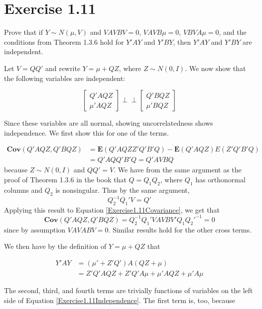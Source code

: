 \documentclass{article}
\newcommand{\indep}{\perp \!\!\! \perp}
\newcommand{\E}{\boldsymbol{E}}
\newcommand{\cov}{\boldsymbol{Cov}}
\begin{document}
\section*{Exercise 1.11}

Prove that if $Y \sim N(\mu, V)$ and $VAVBV=0$, $VAVB\mu=0$, $VBVA\mu=0$, and the conditions from Theorem 1.3.6 hold for $Y'AY$ and $Y'BY$, then $Y'AY$ and $Y'BY$ are independent.

Let $V=QQ'$ and rewrite $Y=\mu + QZ$, where $Z\sim N(0,I)$. We now show that the following variables are independent:

\begin{equation}
\label{Exercise1.11Independence}
\begin{bmatrix}
Q'AQZ \\
\mu'AQZ
\end{bmatrix}
\indep
\begin{bmatrix}
Q'BQZ \\
\mu'BQZ
\end{bmatrix}
\end{equation}

Since these variables are all normal, showing uncorrelatedness shows independence. We first show this for one of the terms.

\begin{align}
\label{Exercise1.11Covariance}
\cov(Q'AQZ, Q'BQZ) &= \E(Q'AQZZ'Q'B'Q) - \E(Q'AQZ)E(Z'Q'B'Q) \\
&= Q'AQQ'B'Q = Q'AVBQ
\end{align}
because $Z \sim N(0, I)$ and $QQ' = V$. We have from the same argument as the proof of Theorem 1.3.6 in the book that $Q = Q_1Q_2$, where $Q_1$ has orthonormal columns and $Q_2$ is nonsingular. Thus by the same argument,
\[
Q_2^{-1}Q_1'V = Q'
\]
Applying this result to Equation \ref{Exercise1.11Covariance}, we get that
\[
\cov(Q'AQZ, Q'BQZ)=Q_2^{-1}Q_1'VAVBV'Q_1Q_2'^{-1} = 0
\]
since by assumption $VAVABV=0$. Similar results hold for the other cross terms.

We then have by the definition of $Y=\mu+QZ$ that

\begin{align*}
Y'AY &= (\mu'+Z'Q')A(QZ+\mu) \\
&= Z'Q'AQZ + Z'Q'A\mu + \mu'AQZ + \mu'A\mu
\end{align*}

The second, third, and fourth terms are trivially functions of variables on the left side of Equation \ref{Exercise1.11Independence}. The first term is, too, because
\end{document}
